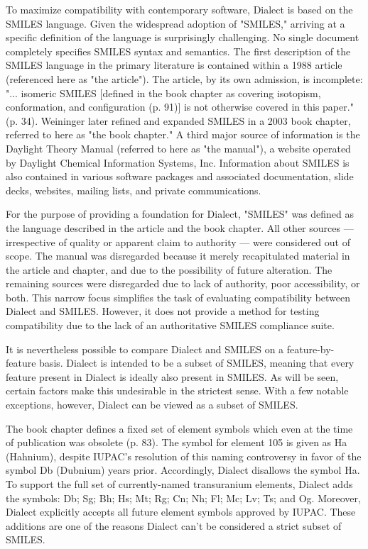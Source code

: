 \documentclass{article}
\begin{document}
To maximize compatibility with contemporary software, Dialect is based on the SMILES language. Given the widespread adoption of "SMILES," arriving at a specific definition of the language is surprisingly challenging. No single document completely specifies SMILES syntax and semantics. The first description of the SMILES language in the primary literature is contained within a 1988 article (referenced here as "the article").\cite{weininger:1988} The article, by its own admission, is incomplete: "... isomeric SMILES [defined in the book chapter as covering isotopism, conformation, and configuration (p. 91)] is not otherwise covered in this paper." (p. 34). Weininger later refined and expanded SMILES in a 2003 book chapter,\cite{weininger:2008} referred to here as "the book chapter." A third major source of information is the Daylight Theory Manual (referred to here as "the manual"), a website operated by Daylight Chemical Information Systems, Inc.\cite{daylightTheory} Information about SMILES is also contained in various software packages and associated documentation, slide decks, websites, mailing lists, and private communications.

For the purpose of providing a foundation for Dialect, "SMILES" was defined as the language described in the article and the book chapter. All other sources --- irrespective of quality or apparent claim to authority --- were considered out of scope. The manual was disregarded because it merely recapitulated material in the article and chapter, and due to the possibility of future alteration. The remaining sources were disregarded due to lack of authority, poor accessibility, or both. This narrow focus simplifies the task of evaluating compatibility between Dialect and SMILES. However, it does not provide a method for testing compatibility due to the lack of an authoritative SMILES compliance suite.

It is nevertheless possible to compare Dialect and SMILES on a feature-by-feature basis. Dialect is intended to be a subset of SMILES, meaning that every feature present in Dialect is ideally also present in SMILES. As will be seen, certain factors make this undesirable in the strictest sense. With a few notable exceptions, however, Dialect can be viewed as a subset of SMILES.

The book chapter defines a fixed set of element symbols which even at the time of publication was obsolete (p. 83). The symbol for element 105 is given as Ha (Hahnium), despite IUPAC's resolution of this naming controversy in favor of the symbol Db (Dubnium) years prior.\cite{sageson:1997} Accordingly, Dialect disallows the symbol Ha. To support the full set of currently-named transuranium elements, Dialect adds the symbols: Db; Sg; Bh; Hs; Mt; Rg; Cn; Nh; Fl; Mc; Lv; Ts; and Og. Moreover, Dialect explicitly accepts all future element symbols approved by IUPAC. These additions are one of the reasons Dialect can't be considered a strict subset of SMILES.
\end{document}
